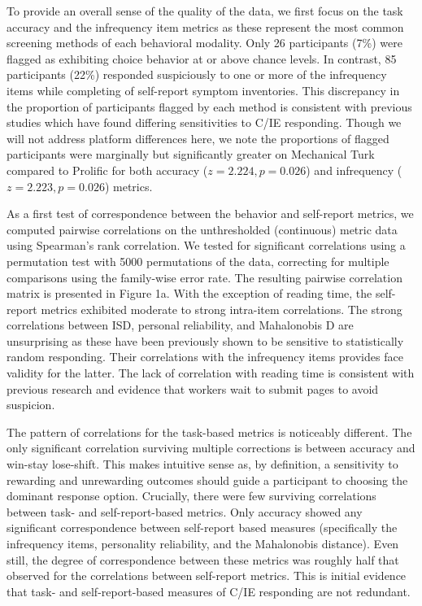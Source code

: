 \documentclass[a4paper,notitlepage,12pt]{article}
\begin{document}
To provide an overall sense of the quality of the data, we first focus on the task accuracy and the infrequency item metrics as these represent the most common screening methods of each behavioral modality. Only 26 participants (7\%) were flagged as exhibiting choice behavior at or above chance levels. In contrast, 85 participants (22\%) responded suspiciously to one or more of the infrequency items while completing of self-report symptom inventories. This discrepancy in the proportion of participants flagged by each method is consistent with previous studies which have found differing sensitivities to C/IE responding. Though we will not address platform differences here, we note the proportions of flagged participants were marginally but significantly greater on Mechanical Turk compared to Prolific for both accuracy ($z=2.224, p=0.026$) and infrequency ($z = 2.223, p = 0.026$) metrics.

As a first test of correspondence between the behavior and self-report metrics, we computed pairwise correlations on the unthresholded (continuous) metric data using Spearman's rank correlation. We tested for significant correlations using a permutation test with 5000 permutations of the data, correcting for multiple comparisons using the family-wise error rate. The resulting pairwise correlation matrix is presented in Figure 1a. With the exception of reading time, the self-report metrics exhibited moderate to strong intra-item correlations. The strong correlations between ISD, personal reliability, and Mahalonobis D are unsurprising as these have been previously shown to be sensitive to statistically random responding. Their correlations with the infrequency items provides face validity for the latter. The lack of correlation with reading time is consistent with previous research and evidence that workers wait to submit pages to avoid suspicion. 

The pattern of correlations for the task-based metrics is noticeably different. The only significant correlation surviving multiple corrections is between accuracy and win-stay lose-shift. This makes intuitive sense as, by definition, a sensitivity to rewarding and unrewarding outcomes should guide a participant to choosing the dominant response option. Crucially, there were few surviving correlations between task- and self-report-based metrics. Only accuracy showed any significant correspondence between self-report based measures (specifically the infrequency items, personality reliability, and the Mahalonobis distance). Even still, the degree of correspondence between these metrics was roughly half that observed for the correlations between self-report metrics. This is initial evidence that task- and self-report-based measures of C/IE responding are not redundant. 
\end{document}
